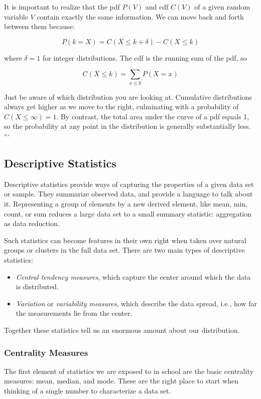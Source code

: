 \documentclass[10pt]{article}
\begin{document}
It is important to realize that the pdf \(P(V)\) and cdf \(C(V)\) of a given random variable \(V\) contain exactly the same information. We can move back and forth between them because:

\[ P(k=X)=C(X \leq k+\delta)-C(X \leq k) \]

where \(\delta=1\) for integer distributions. The cdf is the running sum of the pdf, so

\[ C(X \leq k)=\sum_{x \leq k} P(X=x) \]

Just be aware of which distribution you are looking at. Cumulative distributions always get higher as we move to the right, culminating with a probability of \(C(X \leq \infty)=1\). By contrast, the total area under the curve of a pdf equals 1, so the probability at any point in the distribution is generally substantially less.
```

\subsection{Descriptive Statistics}
Descriptive statistics provide ways of capturing the properties of a given data set or sample. They summarize observed data, and provide a language to talk about it. Representing a group of elements by a new derived element, like mean, min, count, or sum reduces a large data set to a small summary statistic: aggregation as data reduction.

Such statistics can become features in their own right when taken over natural groups or clusters in the full data set. There are two main types of descriptive statistics:

\begin{itemize}
  \item \textit{Central tendency measures}, which capture the center around which the data is distributed.
  \item \textit{Variation} or \textit{variability measures}, which describe the data spread, i.e., how far the measurements lie from the center.
\end{itemize}

Together these statistics tell us an enormous amount about our distribution.

\subsubsection{Centrality Measures}
The first element of statistics we are exposed to in school are the basic centrality measures: mean, median, and mode. These are the right place to start when thinking of a single number to characterize a data set.
\end{document}
